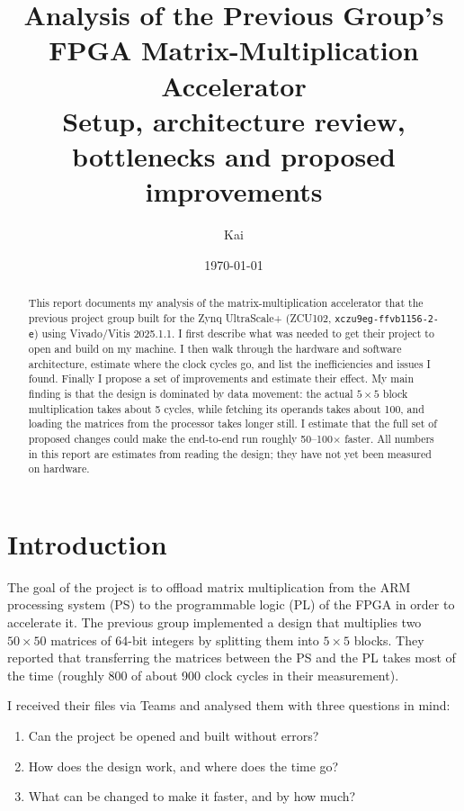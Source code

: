 \documentclass[11pt,a4paper]{article}
\title{Analysis of the Previous Group's FPGA Matrix-Multiplication Accelerator\\[4pt]
\large Setup, architecture review, bottlenecks and proposed improvements}
\author{Kai}
\date{\today}
\newcommand{\code}[1]{\texttt{#1}}
\begin{document}
\setlength{\emergencystretch}{3em}
\maketitle

\begin{abstract}
\noindent
This report documents my analysis of the matrix-multiplication accelerator that the previous project group built for the Zynq UltraScale+ (ZCU102, \code{xczu9eg-ffvb1156-2-e}) using Vivado/Vitis 2025.1.1. I first describe what was needed to get their project to open and build on my machine. I then walk through the hardware and software architecture, estimate where the clock cycles go, and list the inefficiencies and issues I found. Finally I propose a set of improvements and estimate their effect. My main finding is that the design is dominated by data movement: the actual $5\times5$ block multiplication takes about 5 cycles, while fetching its operands takes about 100, and loading the matrices from the processor takes longer still. I estimate that the full set of proposed changes could make the end-to-end run roughly 50--100$\times$ faster. All numbers in this report are estimates from reading the design; they have not yet been measured on hardware.
\end{abstract}

\tableofcontents
\newpage

\section{Introduction}
The goal of the project is to offload matrix multiplication from the ARM processing system (PS) to the programmable logic (PL) of the FPGA in order to accelerate it. The previous group implemented a design that multiplies two $50\times50$ matrices of 64-bit integers by splitting them into $5\times5$ blocks. They reported that transferring the matrices between the PS and the PL takes most of the time (roughly 800 of about 900 clock cycles in their measurement).

I received their files via Teams and analysed them with three questions in mind:
\begin{enumerate}[noitemsep]
  \item Can the project be opened and built without errors?
  \item How does the design work, and where does the time go?
  \item What can be changed to make it faster, and by how much?
\end{enumerate}
\end{document}
